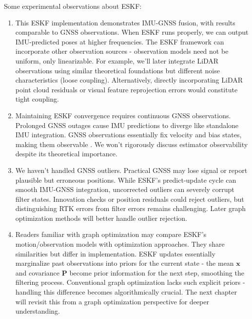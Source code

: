 Some experimental observations about ESKF:
\begin{enumerate}
\item This ESKF implementation demonstrates IMU-GNSS fusion, with results comparable to GNSS observations. When ESKF runs properly, we can output IMU-predicted poses at higher frequencies. The ESKF framework can incorporate other observation sources - observation models need not be uniform, only linearizable. For example, we'll later integrate LiDAR observations using similar theoretical foundations but different noise characteristics (loose coupling). Alternatively, directly incorporating LiDAR point cloud residuals or visual feature reprojection errors would constitute tight coupling.

\item Maintaining ESKF convergence requires continuous GNSS observations. Prolonged GNSS outages cause IMU predictions to diverge like standalone IMU integration. GNSS observations essentially fix velocity and bias states, making them observable \cite{Vidal-Calleja2007}. We won't rigorously discuss estimator observability despite its theoretical importance.

\item We haven't handled GNSS outliers. Practical GNSS may lose signal or report plausible but erroneous positions. While ESKF's predict-update cycle can smooth IMU-GNSS integration, uncorrected outliers can severely corrupt filter states. Innovation checks or position residuals could reject outliers, but distinguishing RTK errors from filter errors remains challenging. Later graph optimization methods will better handle outlier rejection.

\item Readers familiar with graph optimization may compare ESKF's motion/observation models with optimization approaches. They share similarities but differ in implementation. ESKF updates essentially marginalize past observations into priors for the current state - the mean $\mathbf{x}$ and covariance $\mathbf{P}$ become prior information for the next step, smoothing the filtering process. Conventional graph optimization lacks such explicit priors - handling this difference becomes algorithmically crucial. The next chapter will revisit this from a graph optimization perspective for deeper understanding.
\end{enumerate}
